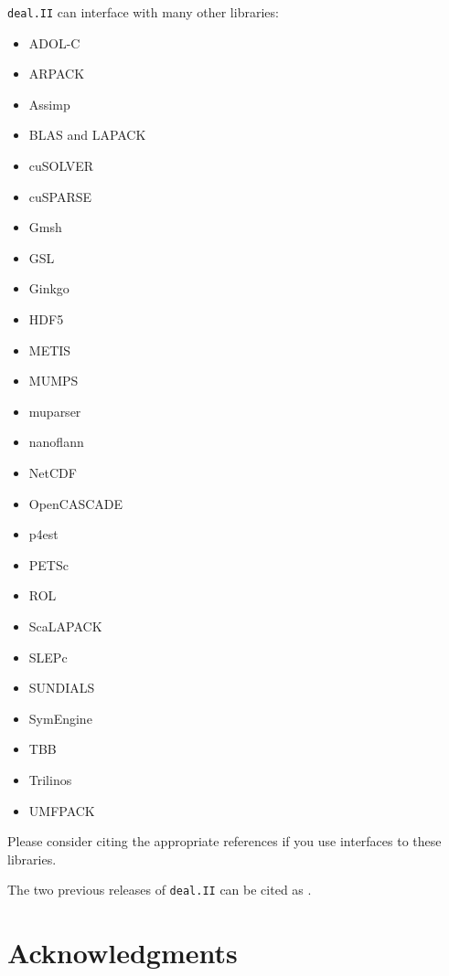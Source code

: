 \documentclass{ansarticle-preprint}
\newcommand{\specialword}[1]{\texttt{#1}}
\newcommand{\dealii}{{\specialword{deal.II}}\xspace}
\begin{document}
\dealii can interface with many other libraries:
\begin{multicols}{3}
\begin{itemize}
\item ADOL-C \cite{Griewank1996a,adol-c}
\item ARPACK \cite{arpack}
\item Assimp \cite{assimp}
\item BLAS and LAPACK \cite{lapack}
\item cuSOLVER \cite{cusolver}
\item cuSPARSE \cite{cusparse}
\item Gmsh \cite{geuzaine2009gmsh}
\item GSL \cite{gsl2016}
\item Ginkgo \cite{ginkgo-web-page}
\item HDF5 \cite{hdf5}
\item METIS \cite{karypis1998fast}
\item MUMPS \cite{ADE00,MUMPS:1,MUMPS:2,mumps-web-page}
\item muparser \cite{muparser-web-page}
\item nanoflann \cite{nanoflann}
\item NetCDF \cite{rew1990netcdf}
\item OpenCASCADE \cite{opencascade-web-page}
\item p4est \cite{p4est}
\item PETSc \cite{petsc-user-ref,petsc-web-page}
\item ROL \cite{ridzal2014rapid}
\item ScaLAPACK \cite{slug}
\item SLEPc \cite{Hernandez:2005:SSF}
\item SUNDIALS \cite{sundials}
\item SymEngine \cite{symengine-web-page}
\item TBB \cite{Rei07}
\item Trilinos \cite{trilinos,trilinos-web-page}
\item UMFPACK \cite{umfpack}
\end{itemize}
\end{multicols}
Please consider citing the appropriate references if you use interfaces to these
libraries.

The two previous releases of \dealii can be cited as
\cite{dealII90,dealII91}.


\section{Acknowledgments}
\end{document}
